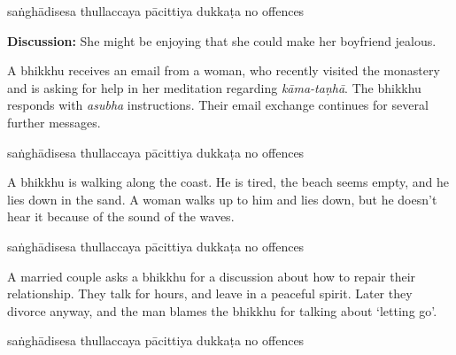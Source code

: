 \begin{exam}{\autoExamName}
\begin{problem*}
\begin{parts}
  \begin{answers}{5}
    \bChoices
     saṅghādisesa\eAns
     thullaccaya\eAns
     pācittiya\eAns
     dukkaṭa\eAns
     no offences\eAns
    \eChoices
  \end{answers}

  \bigskip

  \textbf{Discussion:} She might be enjoying that she could make her boyfriend jealous.

  \bigskip

\item A bhikkhu receives an email from a woman, who recently visited the
  monastery and is asking for help in her meditation regarding \textit{kāma-taṇhā}.
  The bhikkhu responds with \textit{asubha} instructions. Their email exchange
  continues for several further messages.

  \bigskip

  \begin{answers}{5}
    \bChoices
     saṅghādisesa\eAns
     thullaccaya\eAns
     pācittiya\eAns
     dukkaṭa\eAns
     no offences\eAns
    \eChoices
  \end{answers}
  
  \bigskip

\item A bhikkhu is walking along the coast. He is tired, the beach seems empty,
  and he lies down in the sand. A woman walks up to him and lies down, but he
  doesn't hear it because of the sound of the waves.

  \bigskip

  \begin{answers}{5}
    \bChoices
     saṅghādisesa\eAns
     thullaccaya\eAns
     pācittiya\eAns
     dukkaṭa\eAns
     no offences\eAns
    \eChoices
  \end{answers}

  \bigskip

\item A married couple asks a bhikkhu for a discussion about how to repair their
  relationship. They talk for hours, and leave in a peaceful spirit. Later they
  divorce anyway, and the man blames the bhikkhu for talking about `letting go'.

  \bigskip

  \begin{answers}{5}
    \bChoices
     saṅghādisesa\eAns
     thullaccaya\eAns
     pācittiya\eAns
     dukkaṭa\eAns
     no offences\eAns
    \eChoices
  \end{answers}


\end{parts}
\end{problem*}
\end{exam}
